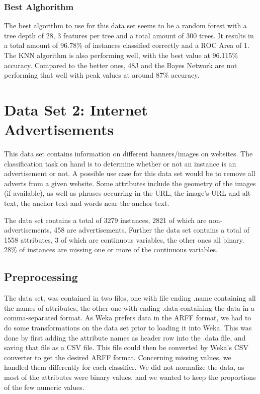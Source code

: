 \documentclass{article}
\begin{document}
\subsubsection{Best Alghorithm}
The best algorithm to use for this data set seems to be a random forest with a tree depth of 28, 3 features per tree and a total amount of 300 trees. It results in a total amount of 96.78\% of instances classified correctly and a ROC Area of 1. The KNN algorithm is also performing well, with the best value at 96.115\% accuracy. Compared to the better ones, 48J and the Bayes Network are not performing that well with peak values at around 87\% accuracy. 


\section{Data Set 2: Internet Advertisements}
This data set contains information on different banners/images on websites. The classification task on hand is to determine whether or not an instance is an advertisement or not. A possible use case for this data set would be to remove all adverts from a given website. Some attributes include the geometry of the images (if available), as well as phrases occurring in the URL, the image's URL and alt text, the anchor text and words near the anchor text.

The data set contains a total of 3279 instances, 2821 of which are non-advertisements, 458 are advertisements. Further the data set contains a total of 1558 attributes, 3 of which are continuous variables, the other ones all binary. 28\% of instances are missing one or more of the continuous variables.


\subsection{Preprocessing}
The data set, was contained in two files, one with file ending .name containing all the names of attributes, the other one with ending .data containing the data in a comma-separated format. As Weka prefers data in the ARFF format, we had to do some transformations on the data set prior to loading it into Weka. This was done by first adding the attribute names as header row into the .data file, and saving that file as a CSV file. This file could then be converted by Weka's CSV converter to get the desired ARFF format.
Concerning missing values, we handled them differently for each classifier. We did not normalize the data, as most of the attributes were binary values, and we wanted to keep the proportions of the few numeric values.
\end{document}
